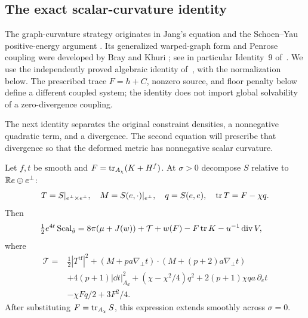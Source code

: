\subsection{The exact scalar-curvature identity}

The graph-curvature strategy originates in Jang's equation and the
Schoen--Yau positive-energy argument
\cite{Jang1978,SchoenYau1981}. Its generalized warped-graph form and
Penrose coupling were developed by Bray and Khuri
\cite{BrayKhuri2010,BrayKhuri2011}; see in particular Identity~9
of~\cite{BrayKhuri2011}. We use the independently proved algebraic identity of~\cite[Proposition~4.1]{NumericalCompanion},
with the normalization below. The prescribed trace $F=h+C$, nonzero source,
and floor penalty below define a different coupled system; the
identity does not import global solvability of a zero-divergence
coupling.

The next identity separates the original constraint densities, a
nonnegative quadratic term, and a divergence.  The second equation will
prescribe that divergence so that the deformed metric has nonnegative
scalar curvature.

\begin{proposition}\label{n3:deformation:identity}
Let $f,t$ be smooth and $F=\operatorname{tr}_{A_\chi}(K+H^f)$. At $\sigma>0$ decompose
$S$ relative to $\mathbb R e\oplus e^\perp$:
\[
 T=S|_{e^\perp\times e^\perp},\quad
 M=S(e,\cdot)|_{e^\perp},\quad q=S(e,e),\quad \operatorname{tr} T=F-\chi q.
\]
Then
\begin{equation}\label{n3:deformation:scalar-identity}
 \begin{split}
 \tfrac12e^{4t}\operatorname{Scal}_{\hat g}
 ={}&8\pi(\mu+J(w))+\mathcal T
       +w(F)-F\operatorname{tr} K-u^{-1}\operatorname{div} V,
 \end{split}
\end{equation}
where
\begin{equation}\label{n3:deformation:quadratic-term}
 \begin{split}
 \mathcal T={}&\tfrac12|T^{\operatorname{tf}}|^2
 +(M+pa\nabla_\perp t)\cdot(M+(p+2)a\nabla_\perp t)\\
 &+4(p+1)|\dd t|_{A_d}^2
   +(\chi-\chi^2/4)q^2+2(p+1)\chi qa\,\partial_e t\\
 &-\chi Fq/2+3F^2/4.
 \end{split}
\end{equation}
After substituting $F=\operatorname{tr}_{A_\chi}S$, this expression extends smoothly
across $\sigma=0$.
\end{proposition}

